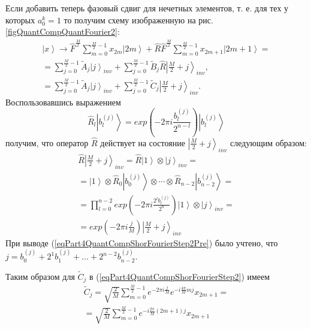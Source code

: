 

Если добавить теперь фазовый сдвиг для нечетных элементов, т. е. для
тех у которых $a_0^k = 1$ то получим схему изображенную на
рис. \ref{figQuantCompQuantFourier2}: 
\begin{eqnarray}
\left|x\right> \rightarrow
\hat{F}^{\frac{M}{2}} \sum_{m = 0}^{\frac{M}{2} - 1}x_{2m} \left|2m\right> +
\hat{R}\hat{F}^{\frac{M}{2}} \sum_{m = 0}^{\frac{M}{2} - 1} x_{2m + 1}
\left|2m+1\right> =
\nonumber \\
= 
\sum^{\frac{M}{2} - 1}_{j = 0} \tilde{A}_{j} \left|j\right>_{inv} +
\sum^{\frac{M}{2} - 1}_{j = 0}  
\tilde{B}_{j} \hat{R}\left|\frac{M}{2} + j\right>_{inv},
\nonumber \\
= 
\sum^{\frac{M}{2} - 1}_{j = 0}  \tilde{A}_{j} \left|j\right>_{inv} +
\sum^{\frac{M}{2} - 1}_{j = 0}  
\tilde{C}_{j} \left|\frac{M}{2} + j\right>_{inv}.
\label{eqPart4QuantCompShorFourierStep2}
\end{eqnarray}
Воспользовавшись выражением
\begin{equation}
\hat{R}_l \left|b^{(j)}_l\right> = 
exp{\left(- 2 \pi i \frac{b^{(j)}_l}{2^{n-l}}\right)}
\left|b^{(j)}_l\right>
\nonumber
\end{equation}
получим, что оператор $\hat{R}$ действует на состояние 
$\left|\frac{M}{2} + j\right>_{inv}$ следующим образом:
\begin{eqnarray}
\hat{R}\left|\frac{M}{2} + j\right>_{inv} = 
\hat{R}\left|1\right> \otimes  \left|j\right>_{inv} = 
\nonumber \\
= 
\left|1\right> \otimes \hat{R}_0 \left|b^{(j)}_0\right>
\otimes \cdots \otimes \hat{R}_{n-2} \left|b^{(j)}_{n-2}\right> = 
\nonumber \\
= 
\prod_{l = 0}^{n-2}exp{\left(- 2 \pi i \frac{2^lb^{(j)}_l}{2^n}\right)}
\left|1\right> \otimes \left|j\right>_{inv} = 
\nonumber \\
=
exp{\left(-2 \pi i \frac{j}{M}\right)}
\left|\frac{M}{2} + j\right>_{inv} 
\label{eqPart4QuantCompShorFourierStep2Pre}
\end{eqnarray}
При выводе (\ref{eqPart4QuantCompShorFourierStep2Pre}) было учтено,
что $j = b^{(j)}_0 + 2^1 b^{(j)}_1 + \dots + 2^{n-2} b^{(j)}_{n-2}$. 

Таким образом для $\tilde{C}_{j}$ в 
(\ref{eqPart4QuantCompShorFourierStep2}) имеем
\begin{eqnarray}
\tilde{C}_{j} = 
\sqrt{\frac{2}{M}} 
\sum_{m = 0}^{\frac{M}{2} - 1} 
e^{- 2 \pi i \frac{j}{M}}
e^{-i \frac{4 \pi}{M} m j} x_{2m+1} =
\nonumber \\
=
\sqrt{\frac{2}{M}} 
\sum_{m = 0}^{\frac{M}{2} - 1} 
e^{-i \frac{2 \pi}{M} \left(2m+1\right) j} x_{2m+1}
\label{eqPart4QuantCompShorC}
\end{eqnarray}

